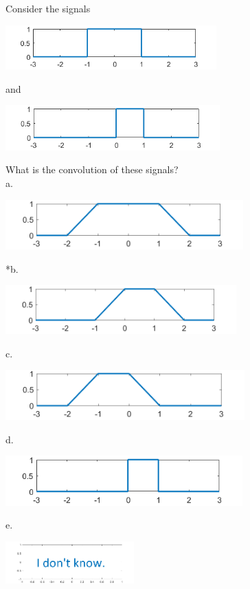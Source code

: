 
Consider the signals

\includegraphics[width=3.19421in,height=0.67072in]{../../Images/ConvolutionQ2Sign1.png}

and

\includegraphics[width=3.25428in,height=0.68333in]{../../Images/ConvolutionQ2Sign2.png}

What is the convolution of these signals?\\

a. 

\includegraphics[width=3.60205in,height=0.75681in]{../../Images/ConvolutionQ2a.png}

*b.

\includegraphics[width=3.50097in,height=0.73558in]{../../Images/ConvolutionQ2b.png}

c. 

\includegraphics[width=3.62337in,height=0.76129in]{../../Images/ConvolutionQ2c.png}

d. 

\includegraphics[width=3.59078in,height=0.75399in]{../../Images/ConvolutionQ2d.png}

e. 

\includegraphics[width=1.94778in,height=0.63207in]{../../Images/AnswerEGraph.png}\\
